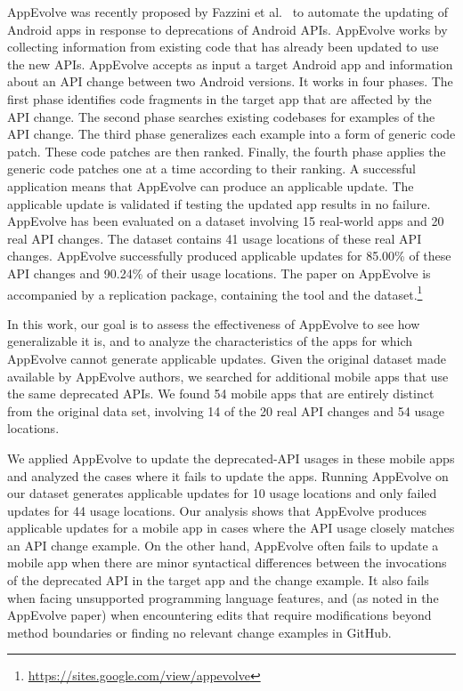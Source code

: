 AppEvolve was recently proposed by Fazzini et
al.~\cite{fazzini2019automated} to automate the updating of Android apps in
response to deprecations of Android APIs.  AppEvolve works by collecting
information from existing code that has already been updated to use the new
APIs.  AppEvolve accepts as input a target Android app and information
about an API change between two Android versions. It works in four
phases. The first phase identifies code fragments in the target app that
are affected by the API change. The second phase searches existing
codebases for examples of the API change. The third phase generalizes each
example into a form of generic code patch. These code patches are then
ranked. Finally, the fourth phase applies the generic code patches one at a
time according to their ranking. A successful application means that
AppEvolve can produce an applicable update. The applicable update is
validated if testing the updated app results in no failure. AppEvolve has
been evaluated on a dataset involving 15 real-world apps and 20 real API
changes. The dataset contains 41 usage locations of these real API
changes. AppEvolve successfully produced applicable updates for 85.00\% of
these API changes and 90.24\% of their usage locations.  The paper on
AppEvolve is accompanied by a replication package, containing the tool and
the dataset.\footnote{\url{https://sites.google.com/view/appevolve}}

In this work, our goal is to assess the effectiveness of AppEvolve to see
how generalizable it is, and to analyze the characteristics of the apps for
which AppEvolve cannot generate applicable updates.  Given the original
dataset made available by AppEvolve authors, we searched for additional
mobile apps that use the same deprecated APIs. We found 54 mobile apps that
are entirely distinct from the original data set, involving 14 of the 20
real API changes and 54 usage locations.

We applied AppEvolve to update the deprecated-API usages in these mobile
apps and analyzed the cases where it fails to update the apps. Running
AppEvolve on our dataset generates applicable updates for 10 usage
locations and only failed updates for 44 usage locations. Our analysis
shows that AppEvolve produces applicable updates for a mobile app in cases
where the API usage closely matches an API change example.  On the other
hand, AppEvolve often fails to update a mobile app when there are minor
syntactical differences between the invocations of the deprecated API in
the target app and the change example.  It also fails when facing
unsupported  programming language
features, and (as noted in the AppEvolve paper) when encountering edits
that require modifications beyond method boundaries or finding no relevant
change examples in GitHub.


